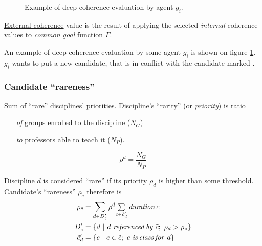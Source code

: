 \documentclass[../../ThesisDoc]{subfiles}
\begin{document}

\begin{figure}[H]
  \centering
  \resizebox{0.7\textwidth}{!}{
    
    }
  \caption[Example of deep coherence evaluation]
          {Example of deep coherence evaluation by agent $g_i$.}
  \label{fig:ConflictDeepCoherence}
\end{figure}
\newpage


\noindent
\underline{External coherence} value is the result of applying the selected
\emph{internal} coherence values to \emph{common goal} function $\Gamma$.

\medskip

\noindent
An example of deep coherence evaluation by some agent $g_i$ is shown on figure
\ref{fig:ConflictDeepCoherence}. $g_i$ wants to put a new candidate, that is
in conflict with the candidate marked .



\subsubsection{Candidate ``rareness''}
Sum of ``rare'' disciplines' priorities. Discipline's ``rarity'' (or
\emph{priority}) is ratio
\begin{itemize}
  \item[\textit{of}] groups enrolled to the discipline ($N_G$)
  \item[\textit{to}] professors able to teach it ($N_P$).
\end{itemize}

$$\rho^d = \dfrac{N_G}{N_P}$$

\medskip
\noindent
Discipline $d$ is considered ``rare'' if its priority $\rho_d$ is higher than
some threshold. \\
\noindent
Candidate's ``rareness'' $\rho_{\tilde{c}}$ therefore is
\begin{align*}
  \rho_{\tilde{c}} &= \sum\limits_{d \in D'_{\tilde{c}}}
        \rho^d \mathsmaller{ \sum\limits_{c \in \tilde{c}'_d}
                              \mathit{duration}\, c }\\
  D'_{\tilde{c}} &= \lbrace d ~|~ d ~\mathit{referenced\,by}~ \tilde{c};~
                                \rho_d > \rho_* \rbrace\\
  \tilde{c}'_d &= \lbrace c ~|~ c \in \tilde{c};~ c ~\mathit{is\,class\,for}~ d \rbrace
\end{align*}
\end{document}
